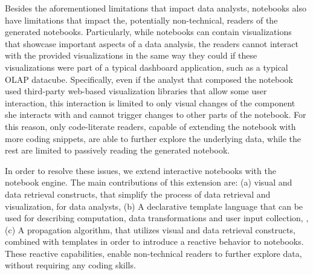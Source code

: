 Besides the aforementioned limitations that impact data analysts, notebooks also have limitations that impact the, potentially non-technical, readers of the generated notebooks. Particularly, while notebooks can contain visualizations that showcase important aspects of a data analysis, the readers cannot interact with the provided visualizations in the same way they could if these visualizations were part of a typical dashboard application, such as a typical OLAP datacube.  Specifically, even if the analyst that composed the notebook used third-party web-based visualization libraries that allow some user interaction, this interaction is limited to only visual changes of the component she interacts with and cannot trigger changes to other parts of the notebook. For this reason, only code-literate readers, capable of extending the notebook with more coding snippets, are able to further explore the underlying data, while the rest are limited to passively reading the generated notebook.




In order to resolve these issues, we extend interactive notebooks  with the  {\projname} notebook engine. The main contributions of this extension are: (a) visual and data retrieval constructs, that simplify the process of data retrieval and visualization, for data analysts, (b) A declarative template language that can be used for describing computation, data transformations and user input collection, , (c)  A propagation algorithm, that utilizes visual and data retrieval constructs, combined with templates in order to introduce a reactive behavior to notebooks. These reactive capabilities, enable non-technical readers to further explore data, without requiring any coding skills.

